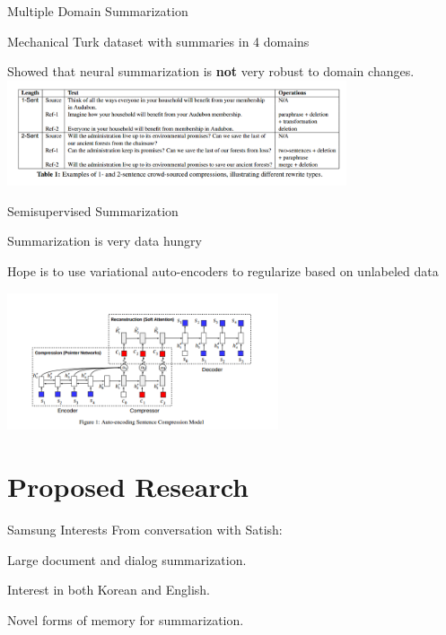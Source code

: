 \documentclass{beamer}
\let\tempone\itemize
\let\temptwo\enditemize
\renewenvironment{itemize}{\tempone\addtolength{\itemsep}{0.5\baselineskip}}{\temptwo}
\newcommand{\Cite}[1]{{\footnotesize \citep{#1}}}
\begin{document}
\begin{frame}{Multiple Domain Summarization \Cite{toutanovadataset}}
  \begin{itemize}
  \item Mechanical Turk dataset with summaries in 4 domains
  \item Showed that neural summarization is \textbf{not} very robust to domain changes.
      \includegraphics[width=10cm]{toutanova}
  \end{itemize}
\end{frame}


\begin{frame}{Semisupervised Summarization \Cite{miao2016language}}
  \begin{itemize}
  \item Summarization is very data hungry
  \item Hope is to use variational auto-encoders to regularize based on unlabeled data

  \end{itemize}
  \begin{center}
    \includegraphics[width=8cm]{textautoencoder}
  \end{center}
\end{frame}

\section{Proposed Research}

\begin{frame}{Samsung Interests}
  From conversation with Satish:
  \begin{itemize}
  \item Large document and dialog summarization.
  \item Interest in both Korean and English.
  \item Novel forms of memory for summarization.
  \end{itemize}
\end{frame}
\end{document}
